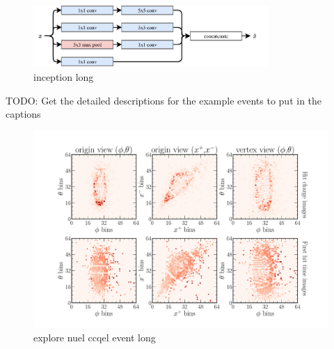 \begin{figure} %
    \includegraphics[width=0.8\textwidth]{diagrams/7-cvn/inception.pdf}
    \caption[inception short]
    {inception long}
    \label{fig:se}
\end{figure} %

TODO: Get the detailed descriptions for the example events to put in the captions
\begin{figure} %
    \includegraphics[width=\textwidth]{diagrams/7-cvn/chipsnet/explore_nuel_ccqel_event.pdf}
    \caption[explore nuel ccqel event short]
    {explore nuel ccqel event long}
    \label{fig:explore_nuel_ccqel_event}
\end{figure} %

